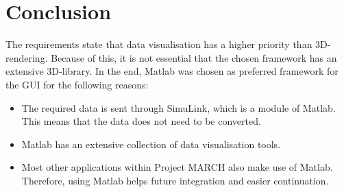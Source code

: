 \section{Conclusion}
The requirements state that data visualisation has a higher priority than 3D-rendering. Because of this, it is not essential that the chosen framework has an extensive 3D-library. In the end, Matlab was chosen as preferred framework for the GUI for the following reasons:
\begin{itemize}
	\item The required data is sent through SimuLink, which is a module of Matlab. This means that the data does not need to be converted.
	\item Matlab has an extensive collection of data visualisation tools.
	\item Most other applications within Project MARCH also make use of Matlab. Therefore, using Matlab helps future integration and easier continuation.
\end{itemize}